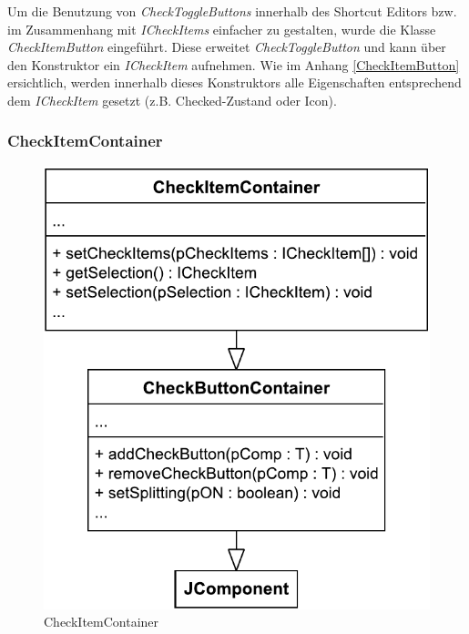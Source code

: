\vspace{-9px}

Um die Benutzung von \emph{CheckToggleButtons} innerhalb des Shortcut Editors bzw. im Zusammenhang mit \emph{ICheckItems} einfacher zu gestalten, wurde die Klasse \emph{CheckItemButton} eingeführt. Diese erweitet \emph{CheckToggleButton} und kann über den Konstruktor ein \emph{ICheckItem} aufnehmen. Wie im Anhang \ref{CheckItemButton} ersichtlich, werden innerhalb dieses Konstruktors alle Eigenschaften entsprechend dem \emph{ICheckItem} gesetzt (z.B. Checked-Zustand oder Icon).

\vspace{-9px}

\subsubsection{CheckItemContainer}

\vspace{-3px}

\begin{figure}
	\vspace{-12px}
	\centering
	\includegraphics[width=.95\linewidth]{../graphic/diagrams/CD_CheckItemContainer/CD_CheckItemContainer}
	\caption{CheckItemContainer}
	\label{fig:cdcheckitemcontainer}
\end{figure}

